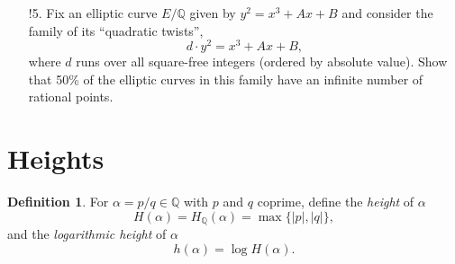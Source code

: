 \documentclass[a4paper]{article}
\theoremstyle{definition}
\newtheorem*{definition}{Definition}
\renewcommand{\O}{\mathcal{O}}
\newcommand{\F}{\mathbb{F}}
\newcommand{\Z}{\mathbb{Z}}
\newcommand{\Q}{\mathbb{Q}}
\begin{document}
\begin{enumerate}
\begin{proof}[Solution]
            \textbf{Proof of claim:} Suppose $P=(x_1,y_1)$, $Q=(x_2,y_2)$, and
            $P\oplus Q=(x_3,y_3)$. Write $s=\frac{y_2-y_1}{x_2-x_1}\in\Z_p$,
            where $x_2-x_1$ is invertible in $\Z_p$ since
            $\bar P\oplus\bar Q\ne\O$. We have a monic cubic
            \begin{equation*}
                (y_1+s(x-x_1))^2 + (a_1x+a_3)(y_1+s(x-x_1))
                    = x^3 + a_2x^2 + a_4x + a_6
            \end{equation*}
            in $x$ over $\Z_p$, whose roots in $\Q_p$ are $x_1,x_2,x_3$, and
            whose roots upon reduction to $\F_p$ are the $x$-coordinates of
            $\bar P,\bar Q,\bar P\oplus\bar Q$. Factoring out $(x-x_1)(x-x_2)$
            we see that $x_3\in\Z_p$, since the equation is monic, and reducing
            to $\F_p$ we see that $x_3$ lifts the $x$-coordinate of
            $\bar P\oplus\bar Q$. Similarly, factoring out the root
            $y_1+s(x_1-x_3)$ of the monic quadratic
            \begin{equation*}
                y^2 + a_1x_3y + a_3y = x_3^3 + a_2x_3^2 + a_4x_3 + a_6
            \end{equation*}
            in $y$ over $\Z_p$, we see that $y_3\in\Z_p$ lifts the
            $y$-coordinate of $\bar P\oplus\bar Q$.
        \end{proof}

    \item[!5.] Fix an elliptic curve $E/\Q$ given by $y^2=x^3+Ax+B$ and consider
        the family of its ``quadratic twists'',
        \begin{equation*}
            d\cdot y^2=x^3+Ax+B,
        \end{equation*}
        where $d$ runs over all square-free integers (ordered by absolute
        value). Show that 50\% of the elliptic curves in this family have an
        infinite number of rational points.
\end{enumerate}

\section{Heights}

\begin{definition}
    For $\alpha=p/q\in\Q$ with $p$ and $q$ coprime, define the \emph{height} of
    $\alpha$
    \begin{equation*}
        H(\alpha) = H_\Q(\alpha) = \max\{|p|,|q|\},
    \end{equation*}
    and the \emph{logarithmic height} of $\alpha$
    \begin{equation*}
        h(\alpha) = \log H(\alpha).
    \end{equation*}
\end{definition}
\end{document}
